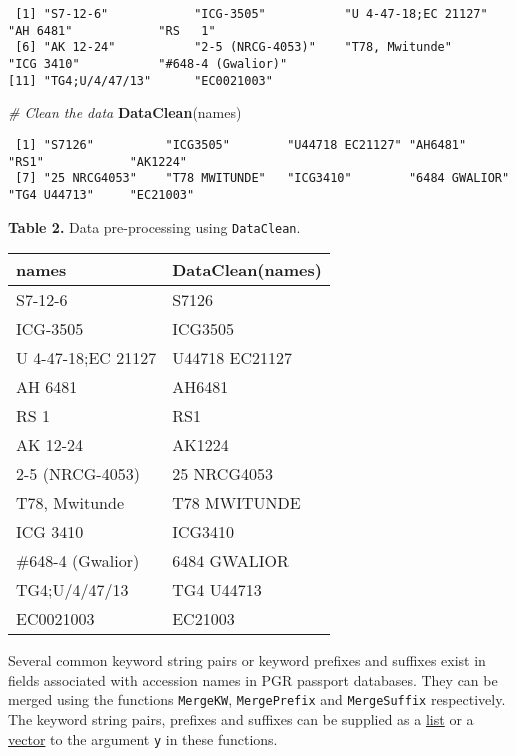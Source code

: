 \documentclass[
]{article}
\newenvironment{Shaded}{\begin{snugshade}}{\end{snugshade}}
\newcommand{\CommentTok}[1]{\textcolor[rgb]{0.56,0.35,0.01}{\textit{#1}}}
\newcommand{\KeywordTok}[1]{\textcolor[rgb]{0.13,0.29,0.53}{\textbf{#1}}}
\newcommand{\NormalTok}[1]{#1}
\begin{document}
\begin{verbatim}
 [1] "S7-12-6"            "ICG-3505"           "U 4-47-18;EC 21127" "AH 6481"            "RS   1"            
 [6] "AK 12-24"           "2-5 (NRCG-4053)"    "T78, Mwitunde"      "ICG 3410"           "#648-4 (Gwalior)"  
[11] "TG4;U/4/47/13"      "EC0021003"         
\end{verbatim}

\begin{Shaded}
\begin{Highlighting}[]
\CommentTok{# Clean the data}
\KeywordTok{DataClean}\NormalTok{(names)}
\end{Highlighting}
\end{Shaded}

\begin{verbatim}
 [1] "S7126"          "ICG3505"        "U44718 EC21127" "AH6481"         "RS1"            "AK1224"        
 [7] "25 NRCG4053"    "T78 MWITUNDE"   "ICG3410"        "6484 GWALIOR"   "TG4 U44713"     "EC21003"       
\end{verbatim}

\textbf{Table 2.} Data pre-processing using \texttt{DataClean}.

\begin{longtable}[]{@{}ll@{}}
\toprule
\textbf{names} & \textbf{DataClean(names)}\tabularnewline
\midrule
\endhead
S7-12-6 & S7126\tabularnewline
ICG-3505 & ICG3505\tabularnewline
U 4-47-18;EC 21127 & U44718 EC21127\tabularnewline
AH 6481 & AH6481\tabularnewline
RS 1 & RS1\tabularnewline
AK 12-24 & AK1224\tabularnewline
2-5 (NRCG-4053) & 25 NRCG4053\tabularnewline
T78, Mwitunde & T78 MWITUNDE\tabularnewline
ICG 3410 & ICG3410\tabularnewline
\#648-4 (Gwalior) & 6484 GWALIOR\tabularnewline
TG4;U/4/47/13 & TG4 U44713\tabularnewline
EC0021003 & EC21003\tabularnewline
\bottomrule
\end{longtable}

Several common keyword string pairs or keyword prefixes and suffixes
exist in fields associated with accession names in PGR passport
databases. They can be merged using the functions \texttt{MergeKW},
\texttt{MergePrefix} and \texttt{MergeSuffix} respectively. The keyword
string pairs, prefixes and suffixes can be supplied as a
\href{http://google.com/\#q=\%5BR\%5D+list}{list} or a
\href{http://google.com/\#q=\%5BR\%5D+vector}{vector} to the argument
\texttt{y} in these functions.
\end{document}
